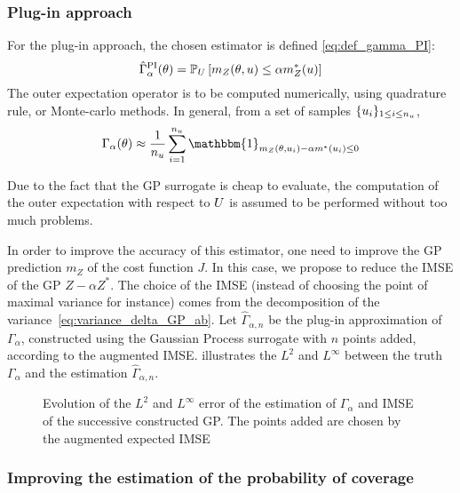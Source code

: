 \documentclass[../../Main_ManuscritThese.tex]{subfiles}
\newcommand\imgpath{/home/victor/acadwriting/Manuscrit/Text/Chapter4/img/}
\begin{document}
\subsubsection{Plug-in approach}
For the plug-in approach, the chosen estimator is defined \cref{eq:def_gamma_PI}:
  \begin{equation}
    \label{eq:def_gamma_PI}
    \hat{\Gamma}_{\alpha}^{\mathrm{PI}}(\theta) = \mathbb{P}_U\left[m_Z(\theta,u) \leq \alpha m_Z^*(u) \right]
  \end{equation}
  The outer expectation operator is to be computed numerically, using quadrature rule, or Monte-carlo methods. In general, from a set of samples $\{u_i\}_{1\leq i \leq n_{u}}$,
  \begin{equation}
    \Gamma_{\alpha}(\kk) \approx \frac{1}{n_{\uu}}\sum_{i=1}^{n_{\uu}} \mathbbm{1}_{m_Z(\kk, \uu_i) - \alpha m^*(\uu_i)\leq 0}
  \end{equation}

  Due to the fact that the GP surrogate is cheap to evaluate, the computation of the outer expectation with respect to $U$ is assumed to be performed without too much problems.

  In order to improve the accuracy of this estimator, one need to improve the GP prediction $m_Z$ of the cost function $J$.
  In this case, we propose to reduce the IMSE of the GP $Z - \alpha Z^*$. The choice of the IMSE (instead of choosing the point of maximal variance for instance) comes from the decomposition of the variance~\cref{eq:variance_delta_GP_ab}.
  Let $\hat{\Gamma}_{\alpha,n}$ be the plug-in approximation of $\Gamma_\alpha$, constructed using the Gaussian Process surrogate with $n$ points added, according to the augmented IMSE.  illustrates the $L^2$ and $L^{\infty}$ between the truth $\Gamma_\alpha$ and the estimation $\hat{\Gamma}_{\alpha,n}$.

\begin{figure}[ht]
  \centering
  
  \caption{\label{fig:IMSE_enrichment} Evolution of the $L^2$ and $L^\infty$ error of the estimation of $\Gamma_\alpha$ and IMSE of the successive constructed GP. The points added are chosen by the augmented expected IMSE}
\end{figure}

  
\subsubsection{Improving the estimation of the probability of coverage}
\cite{echard_ak-mcs_2011,schobi_rare_2017,razaaly_quantile-based_2020}
\end{document}
